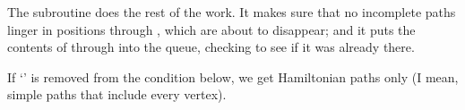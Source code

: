 The  subroutine does
the rest of the work. It makes sure
that no incomplete paths linger in positions  through , which
are about to disappear; and it puts the contents of 
through
 into the queue, checking to see if it was already there.

If `' is removed from the condition below, we get
Hamiltonian paths only (I mean, simple paths that include every vertex).

